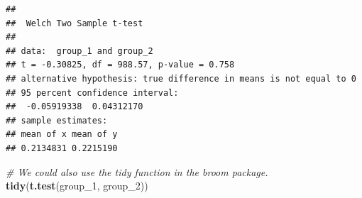 \documentclass[
]{book}
\newenvironment{Shaded}{\begin{snugshade}}{\end{snugshade}}
\newcommand{\CommentTok}[1]{\textcolor[rgb]{0.56,0.35,0.01}{\textit{#1}}}
\newcommand{\DataTypeTok}[1]{\textcolor[rgb]{0.13,0.29,0.53}{#1}}
\newcommand{\DecValTok}[1]{\textcolor[rgb]{0.00,0.00,0.81}{#1}}
\newcommand{\KeywordTok}[1]{\textcolor[rgb]{0.13,0.29,0.53}{\textbf{#1}}}
\newcommand{\NormalTok}[1]{#1}
\newcommand{\OperatorTok}[1]{\textcolor[rgb]{0.81,0.36,0.00}{\textbf{#1}}}
\newcommand{\OtherTok}[1]{\textcolor[rgb]{0.56,0.35,0.01}{#1}}
\newcommand{\StringTok}[1]{\textcolor[rgb]{0.31,0.60,0.02}{#1}}
\begin{document}
\begin{Shaded}
\end{Shaded}

\begin{verbatim}
## 
##  Welch Two Sample t-test
## 
## data:  group_1 and group_2
## t = -0.30825, df = 988.57, p-value = 0.758
## alternative hypothesis: true difference in means is not equal to 0
## 95 percent confidence interval:
##  -0.05919338  0.04312170
## sample estimates:
## mean of x mean of y 
## 0.2134831 0.2215190
\end{verbatim}

\begin{Shaded}
\begin{Highlighting}[]
\CommentTok{# We could also use the tidy function in the broom package.}
\KeywordTok{tidy}\NormalTok{(}\KeywordTok{t.test}\NormalTok{(group_}\DecValTok{1}\NormalTok{, group_}\DecValTok{2}\NormalTok{))}
\end{Highlighting}
\end{Shaded}
\end{document}
